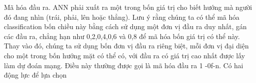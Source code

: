 Mã hóa đầu ra. ANN phải xuất ra một trong bốn giá trị cho biết hướng mà người đó đang nhìn (trái, phải, lên hoặc thẳng). Lưu ý rằng chúng ta có thể mã hóa classification bốn chiều này bằng cách sử dụng một đơn vị đầu ra duy nhất, gán các đầu ra, chẳng hạn như 0,2,0,4,0,6 và 0,8 để mã hóa bốn giá trị có thể này. Thay vào đó, chúng ta sử dụng bốn đơn vị đầu ra riêng biệt, mỗi đơn vị đại diện cho một trong bốn hướng mặt có thể có, với đầu ra có giá trị cao nhất được lấy làm dự đoán mạng. Điều này thường được gọi là mã hóa đầu ra 1 -0f-n. Có hai động lực để lựa chọn

